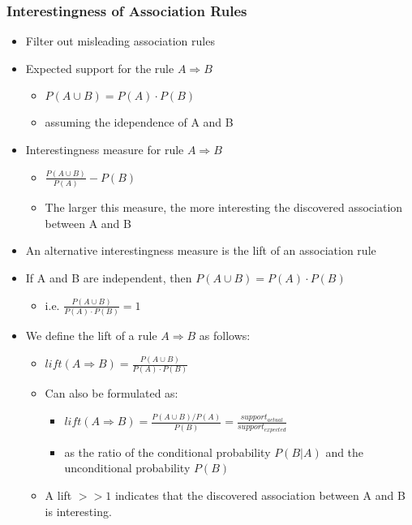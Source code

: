 \documentclass[../notes.tex]{subfiles}
\begin{document}
\subsubsection{Interestingness of Association Rules}
\begin{itemize}
  \item Filter out misleading association rules
  \item Expected support for the rule $A \Rightarrow B$
    \begin{itemize}
      \item $P(A \cup B) = P(A) \cdot P(B)$
      \item assuming the idependence of A and B
    \end{itemize}
  \item Interestingness measure for rule $A \Rightarrow B$
    \begin{itemize}
      \item $\frac{P(A \cup B)}{P(A)} - P(B)$
      \item The larger this measure, the more interesting the discovered association between A and B
    \end{itemize}
  \item An alternative interestingness measure is the lift of an association rule
  \item If A and B are independent, then $P(A \cup B) = P(A) \cdot P(B)$
    \begin{itemize}
      \item i.e. $\frac{P(A \cup B)}{P(A) \cdot P(B)} = 1$
    \end{itemize}
  \item We define the lift of a rule $A \Rightarrow B$ as follows:
    \begin{itemize}
      \item $lift(A \Rightarrow B) = \frac{P(A \cup B)}{P(A) \cdot P(B)}$
      \item Can also be formulated as:
      \begin{itemize}
        \item $lift(A \Rightarrow B) = \frac{P(A \cup B) / P(A)}{P(B)} = \frac{support_{actual}}{support_{expected}}$
        \item as the ratio of the conditional probability $P(B|A)$ and the unconditional probability $P(B)$
      \end{itemize}
      \item A lift $>>1$ indicates that the discovered association between A and B is interesting.
    \end{itemize}  
\end{itemize}
\end{document}
